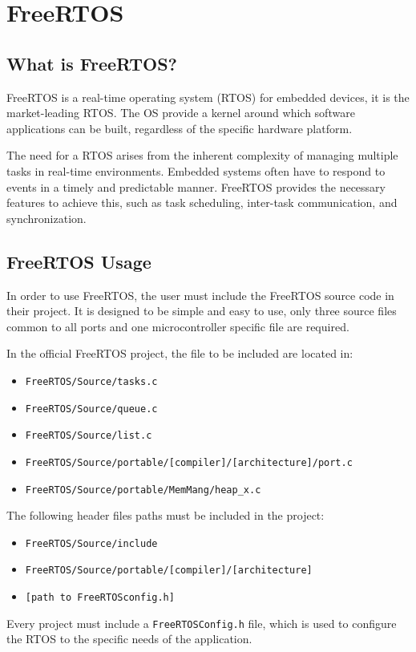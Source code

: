 \section{FreeRTOS}
\subsection{What is FreeRTOS?}
FreeRTOS is a real-time operating system (RTOS) for embedded devices, it is the market-leading RTOS. The OS provide a kernel around which software applications can be built, regardless of the specific hardware platform.

The need for a RTOS arises from the inherent complexity of managing multiple tasks in real-time environments. Embedded systems often have to respond to events in a timely and predictable manner. FreeRTOS provides the necessary features to achieve this, such as task scheduling, inter-task communication, and synchronization.

\subsection{FreeRTOS Usage}
In order to use FreeRTOS, the user must include the FreeRTOS source code in their project. It is designed to be simple and easy to use, only three source files common to all ports and one microcontroller specific file are required.

In the official FreeRTOS project, the file to be included are located in:

\begin{itemize}
    \item \texttt{FreeRTOS/Source/tasks.c}
    \item \texttt{FreeRTOS/Source/queue.c}
    \item \texttt{FreeRTOS/Source/list.c}
    \item \texttt{FreeRTOS/Source/portable/[compiler]/[architecture]/port.c}
    \item \texttt{FreeRTOS/Source/portable/MemMang/heap\_x.c}
\end{itemize}

The following header files paths must be included in the project:

\begin{itemize}
    \item \texttt{FreeRTOS/Source/include}
    \item \texttt{FreeRTOS/Source/portable/[compiler]/[architecture]}
    \item \texttt{[path to FreeRTOSconfig.h]}
\end{itemize}

Every project must include a \texttt{FreeRTOSConfig.h} file, which is used to configure the RTOS to the specific needs of the application.